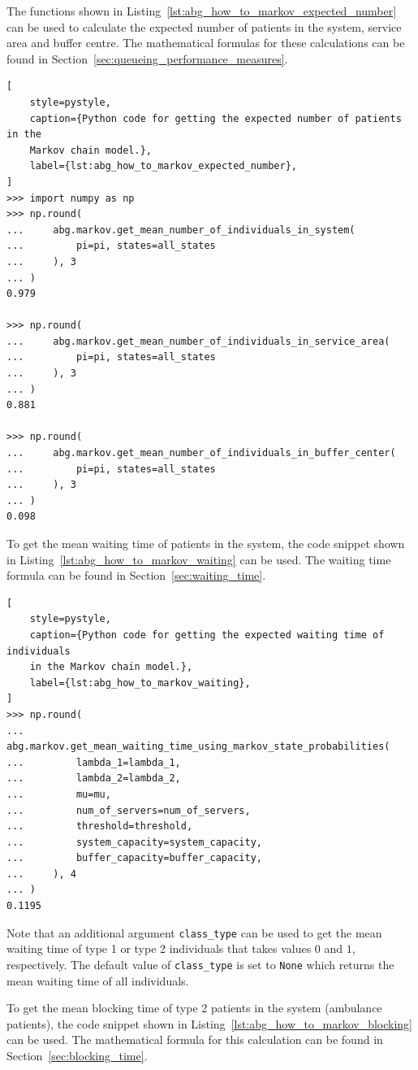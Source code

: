 The functions shown in Listing~\ref{lst:abg_how_to_markov_expected_number}
can be used to calculate the expected number of patients in the system,
service area and buffer centre.
The mathematical formulas for these calculations can be found in
Section~\ref{sec:queueing_performance_measures}.

\begin{lstlisting}[
    style=pystyle,
    caption={Python code for getting the expected number of patients in the
    Markov chain model.},
    label={lst:abg_how_to_markov_expected_number},
]
>>> import numpy as np
>>> np.round(
...     abg.markov.get_mean_number_of_individuals_in_system(
...         pi=pi, states=all_states
...     ), 3
... )
0.979

>>> np.round(
...     abg.markov.get_mean_number_of_individuals_in_service_area(
...         pi=pi, states=all_states
...     ), 3
... )
0.881

>>> np.round(
...     abg.markov.get_mean_number_of_individuals_in_buffer_center(
...         pi=pi, states=all_states
...     ), 3
... )
0.098

\end{lstlisting}

To get the mean waiting time of patients in the system, the code snippet
shown in Listing~\ref{lst:abg_how_to_markov_waiting} can be used.
The waiting time formula can be found in
Section~\ref{sec:waiting_time}.

\begin{lstlisting}[
    style=pystyle,
    caption={Python code for getting the expected waiting time of individuals
    in the Markov chain model.},
    label={lst:abg_how_to_markov_waiting},
]
>>> np.round(
...     abg.markov.get_mean_waiting_time_using_markov_state_probabilities(
...         lambda_1=lambda_1,
...         lambda_2=lambda_2,
...         mu=mu,
...         num_of_servers=num_of_servers,
...         threshold=threshold,
...         system_capacity=system_capacity,
...         buffer_capacity=buffer_capacity,
...     ), 4
... )
0.1195

\end{lstlisting}

Note that an additional argument \texttt{class\_type} can be used to get the
mean waiting time of type 1 or type 2 individuals that takes values \(0\) and
\(1\), respectively.
The default value of \texttt{class\_type} is set to \texttt{None} which
returns the mean waiting time of all individuals.

To get the mean blocking time of type 2 patients in the system (ambulance
patients), the code snippet shown in
Listing~\ref{lst:abg_how_to_markov_blocking} can be used.
The mathematical formula for this calculation can be found in
Section~\ref{sec:blocking_time}.

